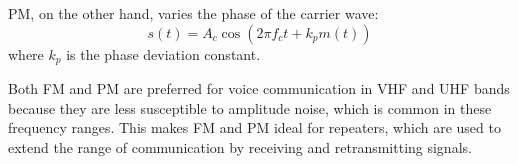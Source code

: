 PM, on the other hand, varies the phase of the carrier wave:
\[
s(t) = A_c \cos\left(2\pi f_c t + k_p m(t)\right)
\]
where \(k_p\) is the phase deviation constant.

Both FM and PM are preferred for voice communication in VHF and UHF bands because they are less susceptible to amplitude noise, which is common in these frequency ranges. This makes FM and PM ideal for repeaters, which are used to extend the range of communication by receiving and retransmitting signals.

